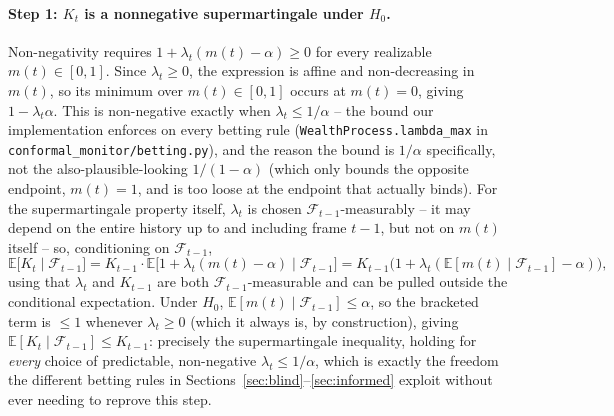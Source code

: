 \paragraph{Step 1: $K_t$ is a nonnegative supermartingale under $H_0$.}
Non-negativity requires $1 + \lambda_t(m(t) - \alpha) \ge 0$ for every realizable $m(t) \in [0,1]$. Since $\lambda_t \ge 0$, the expression is affine and non-decreasing in $m(t)$, so its minimum over $m(t) \in [0,1]$ occurs at $m(t) = 0$, giving $1 - \lambda_t \alpha$. This is non-negative exactly when $\lambda_t \le 1/\alpha$ -- the bound our implementation enforces on every betting rule (\texttt{WealthProcess.lambda\_max} in \texttt{conformal\_monitor/betting.py}), and the reason the bound is $1/\alpha$ specifically, not the also-plausible-looking $1/(1-\alpha)$ (which only bounds the opposite endpoint, $m(t)=1$, and is too loose at the endpoint that actually binds). For the supermartingale property itself, $\lambda_t$ is chosen $\mathcal{F}_{t-1}$-measurably -- it may depend on the entire history up to and including frame $t-1$, but not on $m(t)$ itself -- so, conditioning on $\mathcal{F}_{t-1}$,
\[
\mathbb{E}\big[K_t \mid \mathcal{F}_{t-1}\big] = K_{t-1} \cdot \mathbb{E}\big[1 + \lambda_t(m(t) - \alpha) \mid \mathcal{F}_{t-1}\big] = K_{t-1}\big(1 + \lambda_t(\mathbb{E}[m(t) \mid \mathcal{F}_{t-1}] - \alpha)\big),
\]
using that $\lambda_t$ and $K_{t-1}$ are both $\mathcal{F}_{t-1}$-measurable and can be pulled outside the conditional expectation. Under $H_0$, $\mathbb{E}[m(t) \mid \mathcal{F}_{t-1}] \le \alpha$, so the bracketed term is $\le 1$ whenever $\lambda_t \ge 0$ (which it always is, by construction), giving $\mathbb{E}[K_t \mid \mathcal{F}_{t-1}] \le K_{t-1}$: precisely the supermartingale inequality, holding for \emph{every} choice of predictable, non-negative $\lambda_t \le 1/\alpha$, which is exactly the freedom the different betting rules in Sections~\ref{sec:blind}--\ref{sec:informed} exploit without ever needing to reprove this step.

